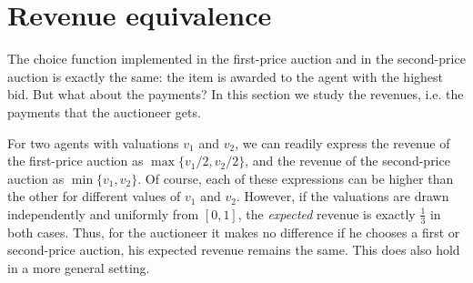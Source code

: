 \section{Revenue equivalence}
\label{sec:auc:5}
The choice function implemented in the first-price auction and in the second-price auction is exactly the same: the item is awarded to the agent with the highest bid. But what about the payments? In this section we study the revenues, i.e. the payments that the auctioneer gets.

For two agents with valuations $v_1$ and $v_2$, we can readily express the revenue of the first-price auction as $\max\{v_1/2,v_2/2\}$, and the revenue of the second-price auction as $\min\{v_1,v_2\}$. Of course, each of these expressions can be higher than the other for different values of $v_1$ and $v_2$. However, if the valuations are drawn independently and uniformly from $[0,1]$, the \emph{expected} revenue is exactly $\frac{1}{3}$ in both cases. Thus, for the auctioneer it makes no difference if he chooses a first or second-price auction, his expected revenue remains the same. This does also hold in a more general setting.



